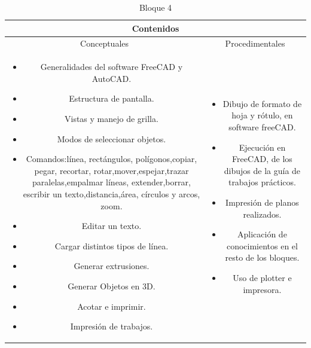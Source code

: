\documentclass[../main]{subfiles}
\begin{document}
\begin{table}[h!]
    \centering
    \begin{tabular}{|c|c|} \hline
         \multicolumn{2}{|c|}{Contenidos} \\ \hline
         Conceptuales & Procedimentales  \\ \hline \hline
        \begin{minipage} [t] {0.4\textwidth} 
            \begin{itemize}
                \item Generalidades del software FreeCAD y AutoCAD.
                \item Estructura de pantalla.
                \item Vistas y manejo de grilla.
                \item Modos de seleccionar objetos.
                \item Comandos:línea, rectángulos, polígonos,copiar, pegar, recortar,
                rotar,mover,espejar,trazar paralelas,empalmar líneas, extender,borrar, escribir un texto,distancia,área, círculos y arcos, zoom.
                \item Editar un texto.
                \item Cargar distintos tipos de línea.
                \item Generar extrusiones.
                \item Generar Objetos en 3D.
                \item Acotar e imprimir.
                \item Impresión de trabajos.
                
            \end{itemize}
        \end{minipage} &  \begin{minipage} [t] {0.4\textwidth} 
            \begin{itemize}
                \item Dibujo de formato de hoja y rótulo, en software freeCAD.
                \item Ejecución en FreeCAD, de los dibujos de la guía de trabajos prácticos.
                \item Impresión de planos realizados.
                \item Aplicación de conocimientos en el resto de los bloques.
                \item Uso de plotter e impresora.
            \end{itemize}
        \end{minipage} \\ \hline
       \end{tabular}
    \caption{Bloque 4}
\end{table}
\end{document}
